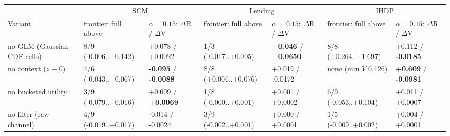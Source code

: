 \begin{tabular}{lllllll}
\toprule
 & \multicolumn{2}{c}{SCM} & \multicolumn{2}{c}{Lending} & \multicolumn{2}{c}{IHDP} \\
\cmidrule(lr){2-3}\cmidrule(lr){4-5}\cmidrule(lr){6-7}
Variant & frontier: full above & $\alpha{=}0.15$: $\Delta$R / $\Delta$V & frontier: full above & $\alpha{=}0.15$: $\Delta$R / $\Delta$V & frontier: full above & $\alpha{=}0.15$: $\Delta$R / $\Delta$V \\
\midrule
no GLM (Gaussian-CDF cells) & 8/9 (-0.006..+0.142) & +0.078 / +0.0022 & 1/3 (-0.017..+0.005) & \textbf{+0.046} / \textbf{+0.0650} & 8/8 (+0.264..+1.697) & +0.112 / \textbf{-0.0185} \\
no context ($z\equiv0$) & 4/6 (-0.043..+0.067) & \textbf{-0.095} / \textbf{-0.0088} & 8/8 (+0.006..+0.076) & +0.019 / -0.0172 & none (min $V$ 0.126) & \textbf{+0.609} / \textbf{-0.0981} \\
no bucketed utility & 3/9 (-0.079..+0.016) & +0.009 / \textbf{+0.0069} & 1/8 (-0.000..+0.001) & +0.001 / +0.0002 & 6/9 (-0.053..+0.104) & +0.011 / +0.0007 \\
no filter (raw channel) & 4/9 (-0.019..+0.017) & -0.014 / -0.0024 & 3/9 (-0.002..+0.001) & +0.000 / +0.0001 & 1/5 (-0.009..+0.002) & +0.004 / +0.0001 \\
\bottomrule
\end{tabular}
